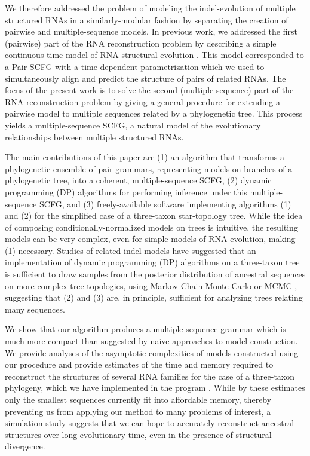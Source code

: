 \documentclass[10pt]{article}
\begin{document}
We therefore addressed the problem of modeling the indel-evolution of
multiple structured RNAs in a similarly-modular fashion by separating
the creation of pairwise and multiple-sequence models.  In previous
work, we addressed the first (pairwise) part of the RNA reconstruction
problem by describing a simple continuous-time model of RNA structural
evolution \cite{Holmes2004}.  This model corresponded to a Pair SCFG
with a time-dependent parametrization which we used to
simultaneously align and predict the structure of
pairs of related RNAs.  The focus of the present work is to solve the second
(multiple-sequence) part of the RNA reconstruction problem by giving a
general procedure for extending a pairwise model to multiple
sequences related by a phylogenetic tree.  This process
yields a multiple-sequence SCFG, a natural model of the evolutionary
relationships between multiple structured RNAs.

The main contributions of this paper are
(1) an algorithm that transforms a phylogenetic ensemble of pair
grammars, representing models on branches of a phylogenetic tree,
into a coherent, multiple-sequence SCFG,
(2) dynamic programming (DP) algorithms for performing inference under
this multiple-sequence SCFG, and
(3) freely-available software implementing algorithms (1) and (2) for
the simplified case of a three-taxon star-topology tree.
While the idea of composing conditionally-normalized models on trees
is intuitive, the resulting models can be very complex, even for
simple models of RNA evolution, making (1) necessary.
Studies of related indel models have suggested that an implementation
of dynamic programming (DP) algorithms on a three-taxon tree is sufficient to
draw samples from the posterior distribution of ancestral sequences on
more complex tree topologies, using Markov Chain Monte Carlo or MCMC
\cite{HolmesBruno2001,JensenHein2002,RedelingsSuchard2005},
suggesting that (2) and (3) are, in principle, sufficient for analyzing trees
relating many sequences.

We show that our algorithm produces a multiple-sequence grammar which is
much more compact than suggested by naive approaches to model
construction.  We provide analyses of the asymptotic complexities of
models constructed using our procedure and provide estimates of the
time and memory required to reconstruct the structures of several RNA
families for the case of a three-taxon phylogeny, which we have
implemented in the program \indiegram. While by these estimates only
the smallest sequences currently fit into affordable memory, thereby
preventing us from applying our method to many problems of interest,
a simulation study suggests that we can hope to accurately reconstruct
ancestral structures over long evolutionary time, even in the presence
of structural divergence.
\end{document}
